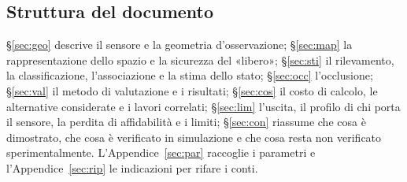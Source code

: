 \subsection{Struttura del documento}\label{sec:intro-struttura}

\S\ref{sec:geo} descrive il sensore e la geometria d'osservazione; \S\ref{sec:map} la rappresentazione dello spazio e la sicurezza del «libero»; \S\ref{sec:sti} il rilevamento, la classificazione, l'associazione e la stima dello stato; \S\ref{sec:occ} l'occlusione; \S\ref{sec:val} il metodo di valutazione e i risultati; \S\ref{sec:cos} il costo di calcolo, le alternative considerate e i lavori correlati; \S\ref{sec:lim} l'uscita, il profilo di chi porta il sensore, la perdita di affidabilità e i limiti; \S\ref{sec:con} riassume che cosa è dimostrato, che cosa è verificato in simulazione e che cosa resta non verificato sperimentalmente. L'Appendice~\ref{sec:par} raccoglie i parametri e l'Appendice~\ref{sec:rip} le indicazioni per rifare i conti.
